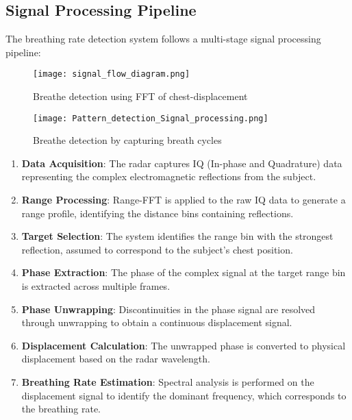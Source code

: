 \documentclass[12pt]{article}
\begin{document}
\subsection{Signal Processing Pipeline}
The breathing rate detection system follows a multi-stage signal processing pipeline:

\begin{figure}[H]
\centering
\begin{minipage}{0.48\textwidth}
  \centering
  \texttt{[image: signal\_flow\_diagram.png]}
  \caption{Breathe detection using FFT of chest-displacement}
\end{minipage}%
\hfill
\begin{minipage}{0.48\textwidth}
  \centering
  \texttt{[image: Pattern\_detection\_Signal\_processing.png]}
  \caption{Breathe detection by capturing breath cycles}
\end{minipage}
\end{figure}

\begin{enumerate}
    \item \textbf{Data Acquisition}: The radar captures IQ (In-phase and Quadrature) data representing the complex electromagnetic reflections from the subject.
    
    \item \textbf{Range Processing}: Range-FFT is applied to the raw IQ data to generate a range profile, identifying the distance bins containing reflections.
    
    \item \textbf{Target Selection}: The system identifies the range bin with the strongest reflection, assumed to correspond to the subject's chest position.
    
    \item \textbf{Phase Extraction}: The phase of the complex signal at the target range bin is extracted across multiple frames.
    
    \item \textbf{Phase Unwrapping}: Discontinuities in the phase signal are resolved through unwrapping to obtain a continuous displacement signal.
    
    \item \textbf{Displacement Calculation}: The unwrapped phase is converted to physical displacement based on the radar wavelength.
    
    \item \textbf{Breathing Rate Estimation}: Spectral analysis is performed on the displacement signal to identify the dominant frequency, which corresponds to the breathing rate.
\end{enumerate}
\end{document}

